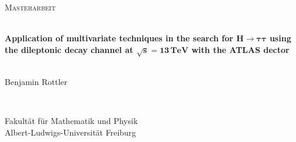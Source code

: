 \begin{titlepage}
    \begin{center}
        \begin{flushleft}
            \Large \textsc{Masterarbeit}\\[0.5cm]
        \end{flushleft}
        \HRule{} \\[0.5cm]
        {\huge \textbf{Application of multivariate techniques in the search for $\bm{H \to \tau\tau}$ using the dileptonic decay channel at $\bm{\sqrt{s} = 13\,\text{TeV}}$ with the ATLAS dector}}\\
        \HRule{} \\[0.5cm]
        \begin{flushleft}
            \Large Benjamin Rottler
        \end{flushleft}
        \vfill
        \HRule{} \\
        \begin{flushright}
            \large
            Fakultät für Mathematik und Physik \\
            Albert-Ludwigs-Universität Freiburg
        \end{flushright}
    \end{center}
\end{titlepage}

